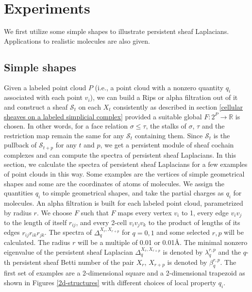 \documentclass[11pt]{article}
\theoremstyle{definition}
\theoremstyle{definition}
\newcommand{\real}{\mathbb R}
\begin{document}
\section{Experiments} \label{experiments}

We first utilize some simple shapes to illustrate persistent sheaf Laplacians. Applications to realistic molecules are also given. 

\subsection{Simple shapes}

Given a labeled point cloud $P$
(i.e., a point cloud with a nonzero quantity $q_i$ associated with each point $v_i$),
we can build a Rips or alpha filtration out of it and construct a sheaf $\mathscr{S}_t$ on each $X_t$ consistently
as described in section \ref{cellular sheaves on a labeled simplicial complex} provided a suitable global $F: 2^P \to \real$ is chosen. 
In other words, for a face relation $\sigma \leqslant \tau$, the stalks of $\sigma$, $\tau$ and the restriction map 
remain the same for any $\mathscr{S}_t$ containing them. 
Since $\mathscr{S}_t$ is the pullback of $\mathscr{S}_{t+p}$ for any $t$ and $p$,  
we get a persistent module of sheaf cochain complexes and can compute the spectra of persistent sheaf Laplacians. 
In this section, we calculate the spectra of persistent sheaf Laplacians for a few examples of point clouds in this way. 
Some examples are the vertices of simple geometrical shapes and some are the coordinates of atoms of molecules.
We assign the quantities $q_i$ to simple geometrical shapes, and take the partial charges as $q_i$ for molecules.
An alpha filtration is built for each labeled point cloud, parametrized by radius $r$.  
We choose $F$ such that $F$ maps every vertex $v_i$ to 1, every edge $v_iv_j$ to the length of itself $r_{ij}$, and every 2-cell $v_iv_jv_k$ to the product of lengths of its edges $r_{ij}r_{ik}r_{jk}$. 
The spectra of $\Delta_q^{X_r, X_{r+p}}$ for $q=0,1$ and some selected $r,p$ will be calculated.
The radius $r$ will be a multiple of 0.01 or 0.01\AA.
The minimal nonzero eigenvalue of the persistent sheaf Laplacian $\Delta_q^{X_r,X_{r+p}}$ is denoted by $\lambda_q^{r, p}$
and the $q$-th persistent sheaf Betti number of the pair $X_r$, $X_{r+p}$ is denoted by $\beta_q^{r, p}$.
The first set of examples are a 2-dimensional square and a 2-dimensional trapezoid as shown in Figures \ref{2d-structures} with different choices of local property $q_i$.
\end{document}
